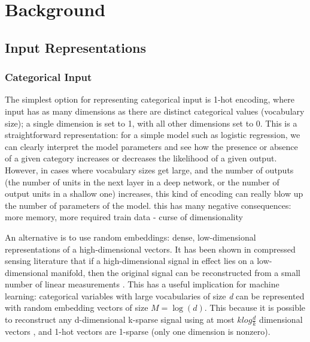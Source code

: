 \chapter{Background}


\section{Input Representations}
\label{data_rep}

\subsection{Categorical Input}

The simplest option for representing categorical input is 1-hot encoding, where input has as many dimensions as there are distinct categorical values (vocabulary size); a single dimension is set to 1, with all other dimensions set to 0.
This is a straightforward representation: for a simple model such as logistic regression, we can clearly interpret the model parameters and see how the presence or absence of a given category increases or decreases the likelihood of a given output.
However, in cases where vocabulary sizes get  large, and the number of outputs (the number of units in the next layer in a deep network,  or the number of output units  in a shallow one) increases, this kind of encoding can really blow up the number of parameters of the model.
 this has many negative consequences: more memory, more required train data - curse of dimensionality

An alternative is to use  random embeddings:  dense, low-dimensional representations of a high-dimensional vectors.
It has been shown in compressed sensing literature that if a high-dimensional signal in effect lies on a low-dimensional manifold, then the original signal can be reconstructed from a small number of linear measurements \cite{compressive_sensing2}.
This has a useful implication for machine learning: categorical variables with large vocabularies of size \textit{d}  can be  represented with  random embedding vectors of size $M = \log(d)$.
This because it is possible to reconstruct any d-dimensional k-sparse signal using at most $k  log{\frac{d}{k}}$ dimensional vectors \cite{compressive_sensing1}, and 1-hot vectors are 1-sparse (only one dimension is nonzero).

